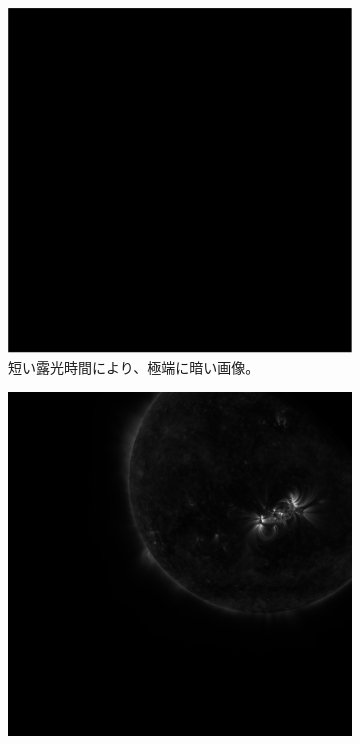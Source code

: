 \begin{figure}[htbp]
    \centering
    \begin{subfigure}[b]{0.48\textwidth}
        \includegraphics[width=\textwidth]{figures/data/bad_sample0.png}
        \caption{短い露光時間により、極端に暗い画像。}
    \end {subfigure}
    \hfill
    \begin{subfigure}[b]{0.48\textwidth}
        \includegraphics[width=\textwidth]{figures/data/bad_sample1.jpg}

\end{subfigure}
\end{figure}

